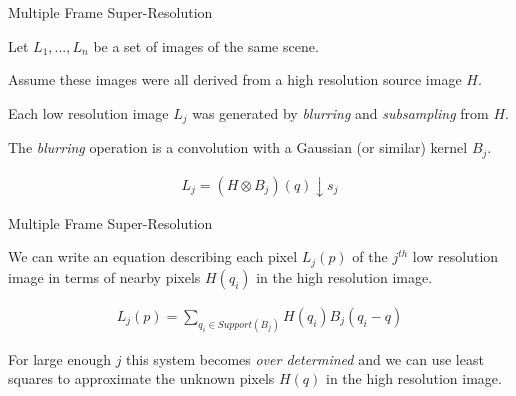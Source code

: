 \documentclass{beamer}
\begin{document}
\begin{frame}{Multiple Frame Super-Resolution}

Let \( {L_1,...,L_n} \) be a set of images of the same scene.

\vspace{0.3cm}

Assume these images were all derived from a high resolution source image \(H\).

\vspace{0.3cm}

Each low resolution image \(L_j\) was generated by \emph{blurring} and \emph{subsampling} from \(H\).

\vspace{0.3cm}

The \emph{blurring} operation is a convolution with a Gaussian (or similar) kernel \(B_j\).

\begin{figure}
\begin{equation}
\begin{aligned}
L_j = \left( H \otimes B_j \right) \left( q \right) \downarrow s_j
\end{aligned}
\end{equation}
\end{figure}

\end{frame}


\begin{frame}{Multiple Frame Super-Resolution}

We can write an equation describing each pixel \(L_j(p)\) of the \(j^{th}\) low resolution image in terms of nearby pixels \(H(q_i)\) in the high resolution image.

\begin{figure}
\begin{equation}
\begin{aligned}
L_j(p) = \sum_{q_i \in Support(B_j)} H( q_i ) B_j( q_i - q )
\end{aligned}
\end{equation}
\end{figure}

For large enough \(j\) this system becomes \emph{over determined} and we can use least squares to approximate the unknown pixels \(H(q)\) in the high resolution image.

\end{frame}
\end{document}
